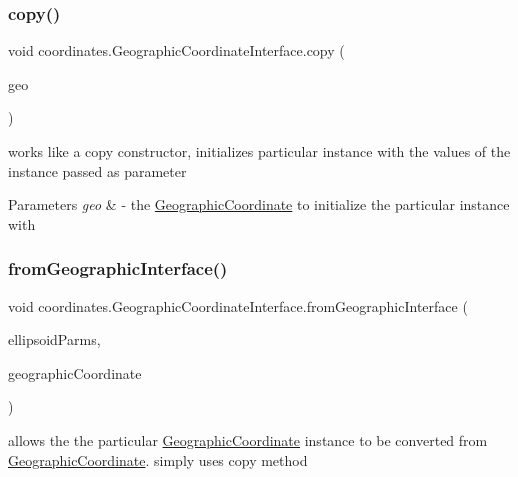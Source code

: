 \subsubsection{\texorpdfstring{copy()}{copy()}}
{\footnotesize\ttfamily void coordinates.\+Geographic\+Coordinate\+Interface.\+copy (\begin{DoxyParamCaption}\item[{\hyperlink{classcoordinates_1_1_geographic_coordinate_interface}{Geographic\+Coordinate\+Interface}}]{geo }\end{DoxyParamCaption})}



works like a copy constructor, initializes particular instance with the values of the instance passed as parameter 


\begin{DoxyParams}{Parameters}
{\em geo} & -\/ the \hyperlink{classcoordinates_1_1_geographic_coordinate}{Geographic\+Coordinate} to initialize the particular instance with \\
\hline
\end{DoxyParams}
\mbox{\label{classcoordinates_1_1_geographic_coordinate_interface_a46c2f155f18261c37578c41a5f40ad1c}} 
\subsubsection{\texorpdfstring{from\+Geographic\+Interface()}{fromGeographicInterface()}}
{\footnotesize\ttfamily void coordinates.\+Geographic\+Coordinate\+Interface.\+from\+Geographic\+Interface (\begin{DoxyParamCaption}\item[{\hyperlink{classparams_1_1_ellipsoid_parms}{Ellipsoid\+Parms}}]{ellipsoid\+Parms,  }\item[{\hyperlink{classcoordinates_1_1_geographic_coordinate_interface}{Geographic\+Coordinate\+Interface}}]{geographic\+Coordinate }\end{DoxyParamCaption})}



allows the the particular \hyperlink{classcoordinates_1_1_geographic_coordinate}{Geographic\+Coordinate} instance to be converted from \hyperlink{classcoordinates_1_1_geographic_coordinate}{Geographic\+Coordinate}. simply uses copy method 


